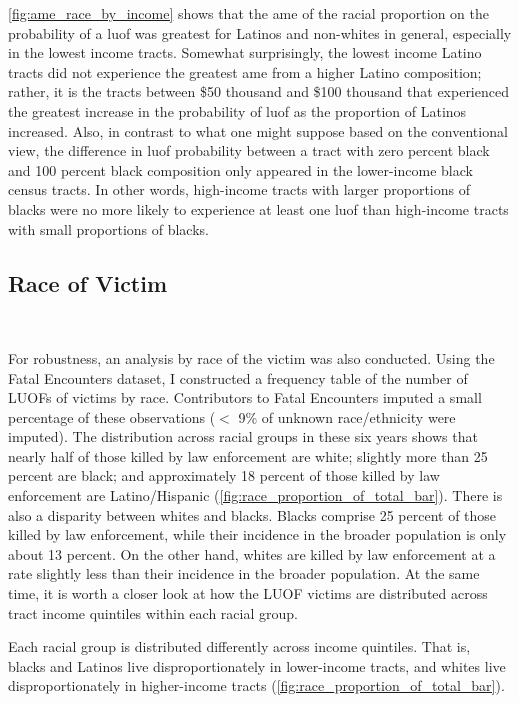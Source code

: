 \documentclass[12pt]{article}
\begin{document}
\autoref{fig:ame_race_by_income} shows that the \gls{ame} of the racial proportion on the probability of a \acrshort{luof} was greatest for Latinos and non-whites in general, especially in the lowest income tracts. Somewhat surprisingly, the lowest income Latino tracts did not experience the greatest \acrshort{ame} from a higher Latino composition; rather, it is the tracts between \$50 thousand and \$100 thousand that experienced the greatest increase in the probability of \acrshort{luof} as the proportion of Latinos increased. Also, in contrast to what one might suppose based on the conventional view, the difference in \acrshort{luof} probability between a tract with zero percent black and 100 percent black composition only appeared in the lower-income black census tracts. In other words, high-income tracts with larger proportions of blacks were no more likely to experience at least one \acrshort{luof} than high-income tracts with small proportions of blacks.


\subsection{Race of Victim}\

For robustness, an analysis by race of the victim was also conducted. Using the Fatal Encounters dataset, I constructed a frequency table of the number of LUOFs of victims by race. Contributors to Fatal Encounters imputed a small percentage of these observations ($<$ 9\% of unknown race/ethnicity were imputed). The distribution across racial groups in these six years shows that nearly half of those killed by law enforcement are white; slightly more than 25 percent are black; and approximately 18 percent of those killed by law enforcement are Latino/Hispanic (\autoref{fig:race_proportion_of_total_bar}). There is also a disparity between whites and blacks. Blacks comprise 25 percent of those killed by law enforcement, while their incidence in the broader population is only about 13 percent. On the other hand, whites are killed by law enforcement at a rate slightly less than their incidence in the broader population. At the same time, it is worth a closer look at how the LUOF victims are distributed across tract income quintiles within each racial group.

Each racial group is distributed differently across income quintiles. That is, blacks and Latinos live disproportionately in lower-income tracts, and whites live disproportionately in higher-income tracts (\autoref{fig:race_proportion_of_total_bar}).
 
\end{document}
